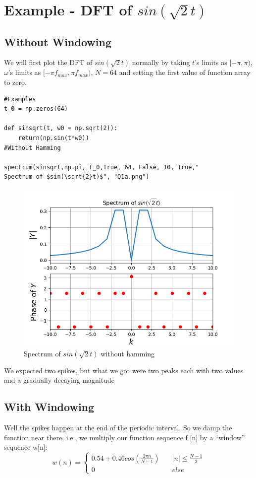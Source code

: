 \documentclass[12pt, a4paper]{report}
\begin{document}
 \section*{Example - DFT of $sin(\sqrt{2}t)$} 
 \small
 \subsection*{Without Windowing}
 \normalsize
 
 We will first plot the DFT of  $sin(\sqrt{2}t)$ normally by taking $t$'s limits as $[-\pi,\pi)$, $\omega$'s limits as $ [-\pi f_{max}, \pi f_{max})$, $N  = 64$ and setting the first value of function array to zero.
 
 \begin{Verbatim}
#Examples
t_0 = np.zeros(64)

def sinsqrt(t, w0 = np.sqrt(2)):
    return(np.sin(t*w0))
#Without Hamming

spectrum(sinsqrt,np.pi, t_0,True, 64, False, 10, True,"
Spectrum of $sin(\sqrt{2}t)$", "Q1a.png")
   \end{Verbatim}

  \begin{figure}[!tbh]
   	\centering
   	\includegraphics[scale=0.7]{Q1a.png}
	\caption{Spectrum of $sin(\sqrt{2}t)$ without hamming}
 \end{figure} 
 We expected two spikes, but what we got were two peaks each with two values and a gradually decaying magnitude
  \subsection*{With Windowing}
 Well the spikes happen at the end of the periodic interval. So we damp the function near there, i.e., we multiply our function sequence f [n] by a “window” sequence w[n]:
 \begin{equation*}
w(n) =  \left\{
        \begin{array}{ll}
            0.54+0.46cos(\frac{2\pi n}{N-1}) & \quad |n| \leq \frac{N-1}{2} \\
           0& \quad else      
             \end{array}
    \right.
 \end{equation*}
 
\end{document}
